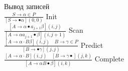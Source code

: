 Вывод записей\\

$\frac{S \rightarrow \alpha \in P}{[S \rightarrow \bullet \alpha](0,0)}$ Init\\

$\frac{\left[A \rightarrow \alpha \bullet a_{j+1} \beta\right](i, j)}{\left[A \rightarrow \alpha a_{j+1} \bullet \beta\right](i, j+1)}$ Scan\\

$\frac{[A \rightarrow \alpha \cdot B \beta](i, j) \quad B \rightarrow \gamma \in P}{[B \rightarrow \bullet \gamma](j, j)}$ Predict\\

$\frac{[A \rightarrow \alpha \cdot B](i, j) \quad[B \rightarrow \gamma \bullet](j, k)}{[A \rightarrow \alpha B \bullet \beta](i, k)}$ Complete\\

